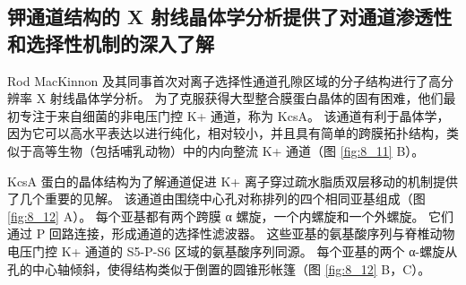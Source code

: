 \subsection{钾通道结构的 X 射线晶体学分析提供了对通道渗透性和选择性机制的深入了解}
Rod MacKinnon 及其同事首次对离子选择性通道孔隙区域的分子结构进行了高分辨率 X 射线晶体学分析。 
为了克服获得大型整合膜蛋白晶体的固有困难，他们最初专注于来自细菌的非电压门控 K+ 通道，称为 KcsA。 
该通道有利于晶体学，因为它可以高水平表达以进行纯化，相对较小，并且具有简单的跨膜拓扑结构，类似于高等生物（包括哺乳动物）中的内向整流 K+ 通道（图 \ref{fig:8_11} B）。


KcsA 蛋白的晶体结构为了解通道促进 K+ 离子穿过疏水脂质双层移动的机制提供了几个重要的见解。 
该通道由围绕中心孔对称排列的四个相同亚基组成（图 \ref{fig:8_12} A）。 
每个亚基都有两个跨膜 α 螺旋，一个内螺旋和一个外螺旋。 
它们通过 P 回路连接，形成通道的选择性滤波器。 
这些亚基的氨基酸序列与脊椎动物电压门控 K+ 通道的 S5-P-S6 区域的氨基酸序列同源。 
每个亚基的两个 α-螺旋从孔的中心轴倾斜，使得结构类似于倒置的圆锥形帐篷（图 \ref{fig:8_12} B，C）。

